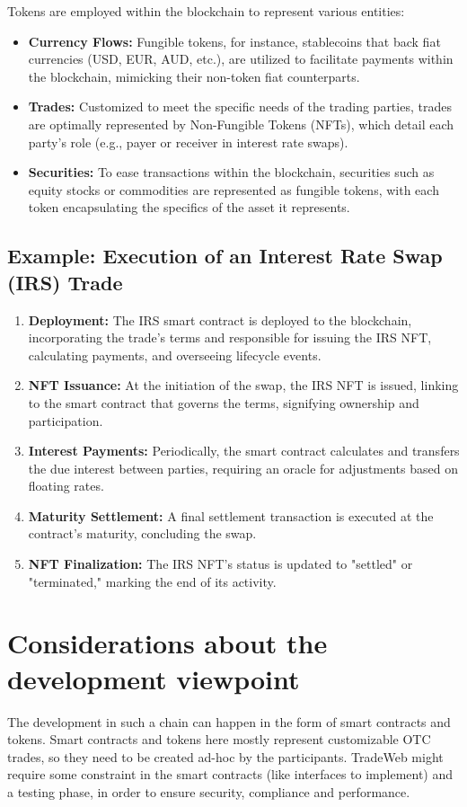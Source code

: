 \documentclass{article}
\begin{document}
Tokens are employed within the blockchain to represent various entities:

\begin{itemize}
    \item \textbf{Currency Flows:} Fungible tokens, for instance, stablecoins that back fiat currencies (USD, EUR, AUD, etc.), are utilized to facilitate payments within the blockchain, mimicking their non-token fiat counterparts.
    \item \textbf{Trades:} Customized to meet the specific needs of the trading parties, trades are optimally represented by Non-Fungible Tokens (NFTs), which detail each party's role (e.g., payer or receiver in interest rate swaps).
    \item \textbf{Securities:} To ease transactions within the blockchain, securities such as equity stocks or commodities are represented as fungible tokens, with each token encapsulating the specifics of the asset it represents.
\end{itemize}

\subsection{Example: Execution of an Interest Rate Swap (IRS) Trade}

\begin{enumerate}
    \item \textbf{Deployment:} The IRS smart contract is deployed to the blockchain, incorporating the trade's terms and responsible for issuing the IRS NFT, calculating payments, and overseeing lifecycle events.
    \item \textbf{NFT Issuance:} At the initiation of the swap, the IRS NFT is issued, linking to the smart contract that governs the terms, signifying ownership and participation.
    \item \textbf{Interest Payments:} Periodically, the smart contract calculates and transfers the due interest between parties, requiring an oracle for adjustments based on floating rates.
    \item \textbf{Maturity Settlement:} A final settlement transaction is executed at the contract's maturity, concluding the swap.
    \item \textbf{NFT Finalization:} The IRS NFT's status is updated to "settled" or "terminated," marking the end of its activity.
\end{enumerate}

\section{Considerations about the development viewpoint}
The development in such a chain can happen in the form of smart contracts and tokens. 
Smart contracts and tokens here mostly represent customizable OTC trades, so they need to be created ad-hoc by the participants. TradeWeb might require some constraint in the smart contracts (like interfaces to implement) and a testing phase, in order to ensure security, compliance and performance.
\end{document}
